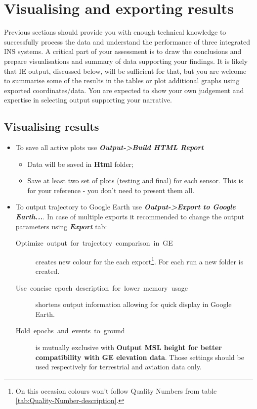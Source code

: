 \documentclass[11pt,fleqn]{book} %
\begin{document}
\chapter{Visualising and exporting results\label{sec:Exporting-final-results}}

Previous sections should provide you with enough technical knowledge to successfully process the data and understand the performance of three integrated INS systems. A critical part of your assessment is to draw the conclusions and prepare visualisations and summary of data supporting your findings. It is likely that IE output, discussed below, will be sufficient for that, but you are welcome to summarise some of the results in the tables or plot additional graphs using exported coordinates/data. You are expected to show your own judgement and expertise in selecting output supporting your narrative.

\section{Visualising results}

\begin{itemize}
	\item To save all active plots use \textbf{\emph{Output->Build HTML Report }}
	\begin{itemize}
		\item Data will be saved in \textbf{Html} folder;
		\item Save at least two set of plots (testing and final) for each sensor. This is for your reference - you don't need to present them all.
	\end{itemize}
	\item To output trajectory to Google Earth use\textbf{\emph{ Output->Export to Google Earth...}}. In case of multiple exports it recommended to change the output parameters using \textbf{\emph{Export}} tab:
	\begin{description}
		\item [{Optimize~output~for~trajectory~comparison~in~GE}] creates new colour for the each export\footnote{On this occasion colours won't follow Quality Numbers from table \ref{tab:Quality-Number-description}.}. For each run a new folder is created.
		\item [{Use~concise~epoch~description~for~lower~memory~usage}] shortens output information allowing for quick display in Google Earth.
		\item [Hold~epochs~and~events~to~ground] is mutually exclusive with \textbf{Output MSL height for better compatibility with GE elevation data}. Those settings should be used respectively for terrestrial and aviation data only.
	\end{description}
\end{itemize}
\end{document}
